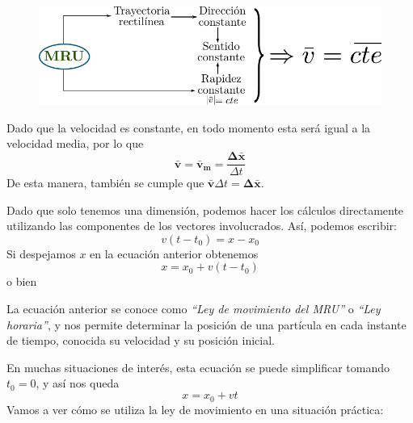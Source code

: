\begin{figure}[!h]
  \centering
  \includegraphics[scale=1]{img/cuadro_MRU.pdf}
\end{figure}

Dado que la velocidad es constante, en todo momento esta será igual a la velocidad media, por lo que
$$\mathbold{\bar{v}}=\mathbold{\bar{v}_m}=\frac{\mathbold{\Delta \bar{x}}}{\Delta t}$$
De esta manera, también se cumple que $\mathbold{\bar{v}} \Delta t=\mathbold{\Delta\bar{x}}$.

Dado que solo tenemos una dimensión, podemos hacer los cálculos directamente utilizando las componentes de los vectores involucrados. Así, podemos escribir:
$${v}(t-t_0)={x}-{x}_0$$
Si despejamos ${x}$ en la ecuación anterior obtenemos
$${x}={x}_0+{v}(t-t_0)$$
o bien
\begin{center}
{\color{NavyBlue}  }
\end{center}

La ecuación anterior se conoce como {\em ``Ley de movimiento del MRU''} o {\em ``Ley horaria''}, y nos permite determinar la posición de una partícula en cada instante de tiempo, conocida su velocidad y su posición inicial.

En muchas situaciones de interés, esta ecuación se puede simplificar tomando $t_0=0$, y así nos queda $${x}={x}_0+{v}t$$
Vamos a ver cómo se utiliza la ley de movimiento en una situación práctica:

